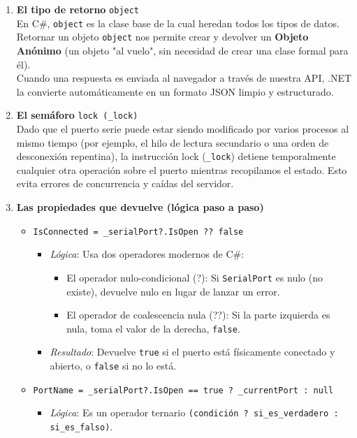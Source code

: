 \documentclass[
10pt, %
a4paper, %
oneside, %
headinclude,footinclude, %
BCOR5mm, %
]{scrartcl}
\begin{document}
\begin{enumerate}
	\item \textbf{El tipo de retorno} \texttt{object}\\
	En C\#, \texttt{object} es la clase base de la cual heredan todos los tipos de datos. Retornar un objeto \texttt{object} nos permite crear y devolver un\textbf{ Objeto Anónimo} (un objeto "al vuelo", sin necesidad de crear una clase formal para él).\\
	Cuando una respuesta es enviada al navegador a través de nuestra API, .NET la convierte automáticamente en un formato JSON limpio y estructurado.
	\item \textbf{El semáforo} \texttt{lock (\_lock) {} }\\
	Dado que el puerto serie puede estar siendo modificado por varios procesos al mismo tiempo (por ejemplo, el hilo de lectura secundario o una orden de desconexión repentina), la instrucción lock (\texttt{\_lock}) detiene temporalmente cualquier otra operación sobre el puerto mientras recopilamos el estado. Esto evita errores de concurrencia y caídas del servidor.
	\item \textbf{Las propiedades que devuelve (lógica paso a paso)}\\
	\begin{itemize}
		\item \texttt{IsConnected = \_serialPort?.IsOpen ?? false}
		\begin{itemize}
			\item \textit{Lógica}: Usa dos operadores modernos de C\#:
			\begin{itemize}
				\item El operador nulo-condicional (?): Si \texttt{SerialPort} es nulo (no existe), devuelve nulo en lugar de lanzar un error.
				\item El operador de coalescencia nula (??): Si la parte izquierda es nula, toma el valor de la derecha, \texttt{false}. 
			\end{itemize}
			\item \textit{Resultado}: Devuelve \texttt{true} si el puerto está físicamente conectado y abierto, o \texttt{false} si no lo está.
		\end{itemize}
		\item \texttt{PortName = \_serialPort?.IsOpen == true ? \_currentPort : null}\\
		\begin{itemize}
			\item \textit{Lógica}: Es un operador ternario \texttt{(condición ? si\_es\_verdadero : si\_es\_falso)}.

\end{itemize}
\end{itemize}
\end{enumerate}
\end{document}
